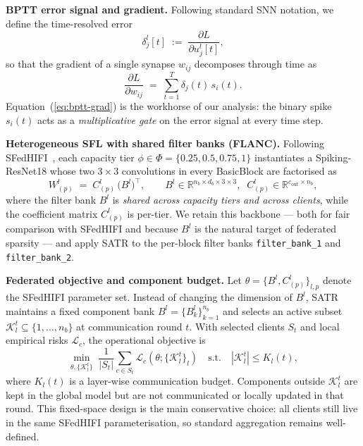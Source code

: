 \documentclass{article} %
\newcommand{\method}{SATR\xspace}
\begin{document}
\textbf{BPTT error signal and gradient.} Following standard SNN notation, we define the time-resolved error
\begin{equation}
\delta_j^l[t] \;:=\; \frac{\partial L}{\partial u_j^l[t]},
\label{eq:delta}
\end{equation}
so that the gradient of a single synapse $w_{ij}$ decomposes through time as
\begin{equation}
\frac{\partial L}{\partial w_{ij}} \;=\; \sum_{t=1}^{T} \delta_j(t)\, s_i(t).
\label{eq:bptt-grad}
\end{equation}
Equation~(\ref{eq:bptt-grad}) is the workhorse of our analysis: the binary spike $s_i(t)$ acts as a \emph{multiplicative gate} on the error signal at every time step.

\textbf{Heterogeneous SFL with shared filter banks (FLANC).} Following SFedHIFI~\citep{tao2026sfedhifi}, each capacity tier $\phi\in\Phi=\{0.25,0.5,0.75,1\}$ instantiates a Spiking-ResNet18 whose two $3\!\times\!3$ convolutions in every BasicBlock are factorised as
\begin{equation}
W_{(p)}^{l} \;=\; C_{(p)}^{l}\,\big(B^{l}\big)^{\!\top}, \qquad B^l \in \mathbb{R}^{n_b \times d_b \times 3 \times 3},\;\; C_{(p)}^l \in \mathbb{R}^{c_{\text{out}}\times n_b},
\label{eq:flanc}
\end{equation}
where the filter bank $B^l$ is \emph{shared across capacity tiers and across clients}, while the coefficient matrix $C_{(p)}^l$ is per-tier. We retain this backbone --- both for fair comparison with SFedHIFI and because $B^l$ is the natural target of federated sparsity --- and apply \method to the per-block filter banks \texttt{filter\_bank\_1} and \texttt{filter\_bank\_2}.

\textbf{Federated objective and component budget.} Let $\theta=\{B^l, C_{(p)}^l\}_{l,p}$ denote the SFedHIFI parameter set. Instead of changing the dimension of $B^l$, \method maintains a fixed component bank $B^l = \{B_k^l\}_{k=1}^{n_b}$ and selects an active subset $\mathcal{K}_l^t\subseteq\{1,\dots,n_b\}$ at communication round $t$. With selected clients $S_t$ and local empirical risks $\mathcal{L}_c$, the operational objective is
\begin{equation}
\min_{\theta,\{\mathcal{K}_l^t\}} \; \frac{1}{|S_t|}\sum_{c\in S_t} \mathcal{L}_c\!\left(\theta; \{\mathcal{K}_l^t\}_{l}\right)
\quad \text{s.t.}\quad |\mathcal{K}_l^t| \le K_l(t),
\label{eq:objective}
\end{equation}
where $K_l(t)$ is a layer-wise communication budget. Components outside $\mathcal{K}_l^t$ are kept in the global model but are not communicated or locally updated in that round. This fixed-space design is the main conservative choice: all clients still live in the same SFedHIFI parameterisation, so standard aggregation remains well-defined.
\end{document}
